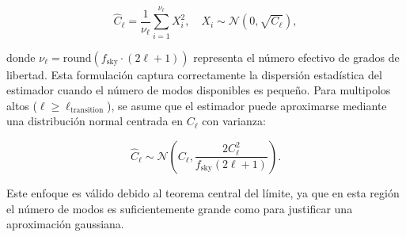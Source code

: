 \documentclass[11pt]{article}
\begin{document}
\begin{equation}
\hat{C}_\ell = \frac{1}{\nu_\ell} \sum_{i=1}^{\nu_\ell} X_i^2, \quad X_i \sim \mathcal{N}(0, \sqrt{C_\ell}),
\end{equation}

donde \(\nu_\ell = \text{round}(f_{\text{sky}} \cdot (2\ell + 1))\) representa el número efectivo de grados de libertad. Esta formulación captura correctamente la dispersión estadística del estimador cuando el número de modos disponibles es pequeño. Para multipolos altos (\(\ell \geq \ell_{\text{transition}}\)), se asume que el estimador puede aproximarse mediante una distribución normal centrada en \(C_\ell\) con varianza:

\begin{equation}
\hat{C}_\ell \sim \mathcal{N}\left(C_\ell, \frac{2 C_\ell^2}{f_{\text{sky}} (2\ell + 1)} \right).
\end{equation}

Este enfoque es válido debido al teorema central del límite, ya que en esta región el número de modos es suficientemente grande como para justificar una aproximación gaussiana.
\end{document}
